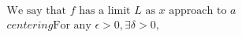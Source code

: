 \documentclass[preview]{standalone}
\begin{document}
\begin{align*}
{\text{We say that } f \text{ has a limit } L \text{ as } x \text{ approach to } a} \\centering\text{For any }\epsilon > 0, \exists \delta > 0,
\end{align*}
\end{document}
